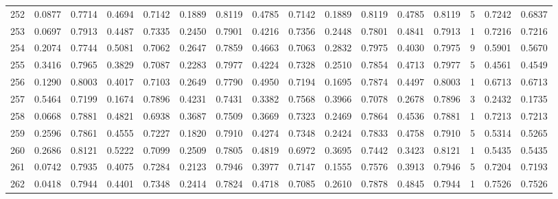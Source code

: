 \begin{tabular}{lrrrrrrrrrrrrrrr}
252 &      0.0877 &  0.7714 &  0.4694 &  0.7142 &  0.1889 &  0.8119 &  0.4785 &  0.7142 &  0.1889 &  0.8119 &   0.4785 &     0.8119 &      5 &                    0.7242 &                     0.6837 \\
253 &      0.0697 &  0.7913 &  0.4487 &  0.7335 &  0.2450 &  0.7901 &  0.4216 &  0.7356 &  0.2448 &  0.7801 &   0.4841 &     0.7913 &      1 &                    0.7216 &                     0.7216 \\
254 &      0.2074 &  0.7744 &  0.5081 &  0.7062 &  0.2647 &  0.7859 &  0.4663 &  0.7063 &  0.2832 &  0.7975 &   0.4030 &     0.7975 &      9 &                    0.5901 &                     0.5670 \\
255 &      0.3416 &  0.7965 &  0.3829 &  0.7087 &  0.2283 &  0.7977 &  0.4224 &  0.7328 &  0.2510 &  0.7854 &   0.4713 &     0.7977 &      5 &                    0.4561 &                     0.4549 \\
256 &      0.1290 &  0.8003 &  0.4017 &  0.7103 &  0.2649 &  0.7790 &  0.4950 &  0.7194 &  0.1695 &  0.7874 &   0.4497 &     0.8003 &      1 &                    0.6713 &                     0.6713 \\
257 &      0.5464 &  0.7199 &  0.1674 &  0.7896 &  0.4231 &  0.7431 &  0.3382 &  0.7568 &  0.3966 &  0.7078 &   0.2678 &     0.7896 &      3 &                    0.2432 &                     0.1735 \\
258 &      0.0668 &  0.7881 &  0.4821 &  0.6938 &  0.3687 &  0.7509 &  0.3669 &  0.7323 &  0.2469 &  0.7864 &   0.4536 &     0.7881 &      1 &                    0.7213 &                     0.7213 \\
259 &      0.2596 &  0.7861 &  0.4555 &  0.7227 &  0.1820 &  0.7910 &  0.4274 &  0.7348 &  0.2424 &  0.7833 &   0.4758 &     0.7910 &      5 &                    0.5314 &                     0.5265 \\
260 &      0.2686 &  0.8121 &  0.5222 &  0.7099 &  0.2509 &  0.7805 &  0.4819 &  0.6972 &  0.3695 &  0.7442 &   0.3423 &     0.8121 &      1 &                    0.5435 &                     0.5435 \\
261 &      0.0742 &  0.7935 &  0.4075 &  0.7284 &  0.2123 &  0.7946 &  0.3977 &  0.7147 &  0.1555 &  0.7576 &   0.3913 &     0.7946 &      5 &                    0.7204 &                     0.7193 \\
262 &      0.0418 &  0.7944 &  0.4401 &  0.7348 &  0.2414 &  0.7824 &  0.4718 &  0.7085 &  0.2610 &  0.7878 &   0.4845 &     0.7944 &      1 &                    0.7526 &                     0.7526 \\

\end{tabular}
